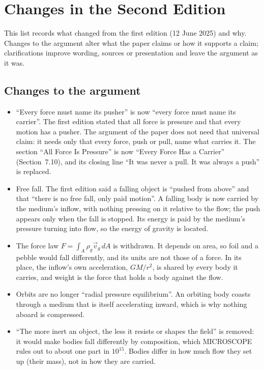 \documentclass[11pt,a4paper]{article}
\begin{document}
\clearpage
\section*{Changes in the Second Edition}

This list records what changed from the first edition (12 June 2025) and why. Changes to the argument alter what the paper claims or how it supports a claim; clarifications improve wording, sources or presentation and leave the argument as it was.

\subsection*{Changes to the argument}
\begin{itemize}
  \item ``Every force must name its pusher'' is now ``every force must name its carrier''. The first edition stated that all force is pressure and that every motion has a pusher. The argument of the paper does not need that universal claim: it needs only that every force, push or pull, name what carries it. The section ``All Force Is Pressure'' is now ``Every Force Has a Carrier'' (Section~7.10), and its closing line ``It was never a pull. It was always a push'' is replaced.
  \item Free fall. The first edition said a falling object is ``pushed from above'' and that ``there is no free fall, only paid motion''. A falling body is now carried by the medium's inflow, with nothing pressing on it relative to the flow; the push appears only when the fall is stopped. Its energy is paid by the medium's pressure turning into flow, so the energy of gravity is located.
  \item The force law $F=\int_A \rho_g \vec v_g\,dA$ is withdrawn. It depends on area, so foil and a pebble would fall differently, and its units are not those of a force. In its place, the inflow's own acceleration, $GM/r^2$, is shared by every body it carries, and weight is the force that holds a body against the flow.
  \item Orbits are no longer ``radial pressure equilibrium''. An orbiting body coasts through a medium that is itself accelerating inward, which is why nothing aboard is compressed.
  \item ``The more inert an object, the less it resists or shapes the field'' is removed: it would make bodies fall differently by composition, which MICROSCOPE rules out to about one part in $10^{15}$. Bodies differ in how much flow they set up (their mass), not in how they are carried.

\end{itemize}
\end{document}
